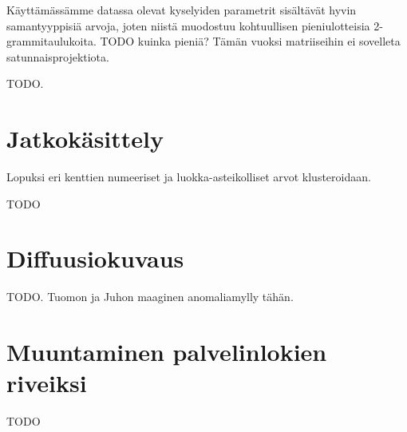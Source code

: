 Käyttämässämme datassa olevat kyselyiden parametrit sisältävät hyvin
samantyyppisiä arvoja, joten niistä muodostuu kohtuullisen
pieniulotteisia 2-grammitaulukoita. TODO kuinka pieniä? Tämän vuoksi
matriiseihin ei sovelleta satunnaisprojektiota.

TODO.

\section{Jatkokäsittely}

Lopuksi eri kenttien numeeriset ja
luokka-asteikolliset arvot klusteroidaan.

TODO

\section{Diffuusiokuvaus}

TODO. Tuomon ja Juhon maaginen anomaliamylly tähän.

\section{Muuntaminen palvelinlokien riveiksi}

TODO
